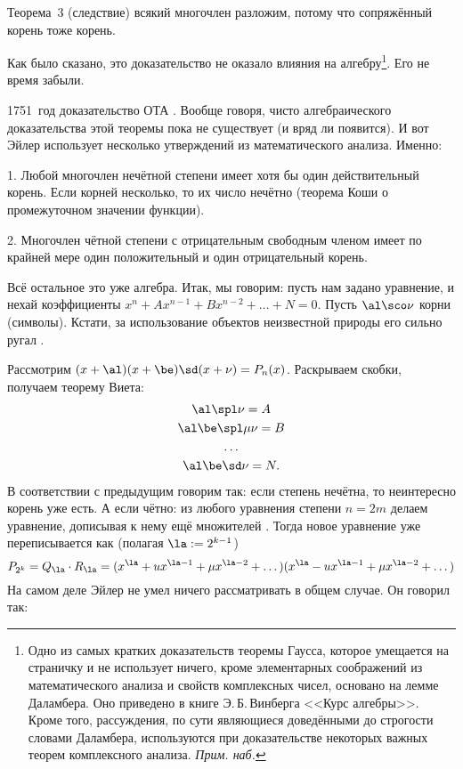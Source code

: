 \documentclass[a4paper,oneside,fleqn,10pt]{article}
\begin{document}
Теорема~3 (следствие) всякий многочлен разложим, потому что
сопряжённый корень тоже корень.

Как было сказано, это доказательство не оказало влияния на
алгебру\footnote{Одно из самых кратких доказательств теоремы Гаусса,
  которое умещается на страничку и не использует ничего, кроме
  элементарных соображений из математического анализа и свойств
  комплексных чисел, основано на лемме Даламбера. Оно приведено в
  книге Э.\,Б.\,Винберга <<Курс алгебры>>. Кроме того, рассуждения, по
  сути являющиеся доведёнными до строгости словами Даламбера,
  используются при доказательстве некоторых важных теорем комплексного
  анализа. \emph{Прим. наб.}}. Его не время забыли.

1751~год доказательство ОТА . Вообще говоря,
чисто алгебраического доказательства этой теоремы пока не существует
(и вряд ли появится). И вот Эйлер использует несколько утверждений из
математического анализа. Именно:

1. Любой многочлен нечётной степени имеет хотя бы один действительный
корень.  Если корней несколько, то их число нечётно (теорема Коши о
промежуточном значении функции).

2. Многочлен чётной степени с отрицательным свободным членом имеет по
крайней мере один положительный и один отрицательный корень.

Всё остальное это уже алгебра. Итак, мы говорим: пусть нам задано
уравнение, и нехай коэффициенты $x^n + Ax^{n-1} + B x^{n-2}+ \dots + N
= 0$.  Пусть $\al\sco \nu$ корни (символы). Кстати, за использование
объектов неизвестной природы его сильно ругал .

Рассмотрим $(x + \al)(x + \be)\sd(x+\nu) = P_n(x)$.  Раскрываем
скобки, получаем теорему Виета:
\begin{gather*}
\al \spl \nu = A\\ \al\be \spl \mu\nu = B\\ \ldots\\ \al\be\sd\nu = N.
\end{gather*}
В соответствии с предыдущим говорим так: если степень нечётна, то
неинтересно корень уже есть.  А если чётно: из любого уравнения
степени $n = 2m$ делаем уравнение, дописывая к нему ещё множителей
. Тогда новое уравнение уже переписывается как
(полагая $\la := 2^{k-1}$)
$$ P_{2^k} = Q_\la \cdot R_\la= (x^\la + u x^{\la-1} + \mu x^{\la-2} +
\dots)(x^\la - u x^{\la-1} + \mu x^{\la-2}+\dots )
$$ На самом деле Эйлер не умел ничего рассматривать в общем случае. Он
говорил так:
\end{document}
